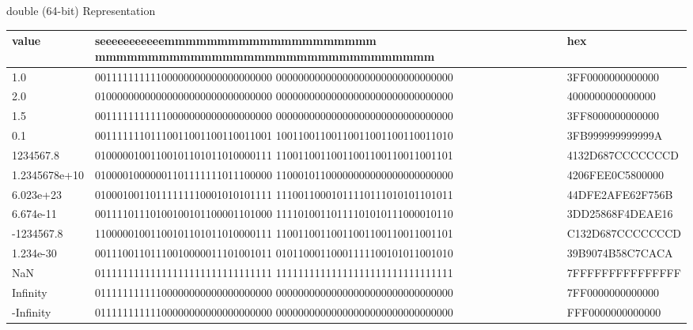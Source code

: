 \begin{withoutheadline}
\begin{frame}[fragile]{double (64-bit) Representation}
\setlength{\tabcolsep}{2pt}
\scriptsize
\ttfamily
\begin{tabular}{p{2cm}|p{10cm}|p{2cm}} \toprule
value         & seeeeeeeeeeemmmmmmmmmmmmmmmmmmmm mmmmmmmmmmmmmmmmmmmmmmmmmmmmmmmm &              hex \\ \midrule
1.0           & 00111111111100000000000000000000 00000000000000000000000000000000 & 3FF0000000000000 \\
2.0           & 01000000000000000000000000000000 00000000000000000000000000000000 & 4000000000000000 \\
1.5           & 00111111111110000000000000000000 00000000000000000000000000000000 & 3FF8000000000000 \\
0.1           & 00111111101110011001100110011001 10011001100110011001100110011010 & 3FB999999999999A \\
1234567.8     & 01000001001100101101011010000111 11001100110011001100110011001101 & 4132D687CCCCCCCD \\
1.2345678e+10 & 01000010000001101111111011100000 11000101100000000000000000000000 & 4206FEE0C5800000 \\
6.023e+23     & 01000100110111111110001010101111 11100110001011110111010101101011 & 44DFE2AFE62F756B \\
6.674e-11     & 00111101110100100101100001101000 11110100110111101010111000010110 & 3DD25868F4DEAE16 \\
-1234567.8    & 11000001001100101101011010000111 11001100110011001100110011001101 & C132D687CCCCCCCD \\
1.234e-30     & 00111001101110010000011101001011 01011000110001111100101011001010 & 39B9074B58C7CACA \\    
NaN           & 01111111111111111111111111111111 11111111111111111111111111111111 & 7FFFFFFFFFFFFFFF \\
Infinity      & 01111111111100000000000000000000 00000000000000000000000000000000 & 7FF0000000000000 \\
-Infinity     & 01111111111100000000000000000000 00000000000000000000000000000000 & FFF0000000000000 \\ \bottomrule
\end{tabular}
\end{frame}
    

\end{withoutheadline}
